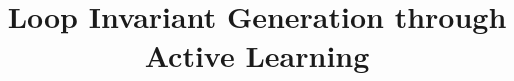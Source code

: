\documentclass{llncs}
\begin{document}

\title{Loop Invariant Generation through Active Learning}



\maketitle
\end{document}

